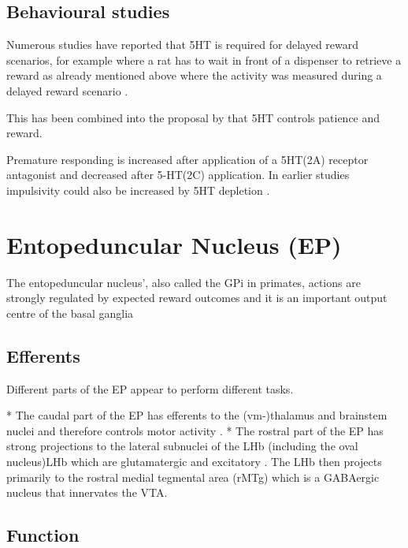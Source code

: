\documentclass[12pt,a4paper]{article}
\let\oldsection\section
\renewcommand\section{\clearpage\oldsection}
\begin{document}
\subsection{Behavioural studies}

Numerous studies have reported that 5HT is required for delayed reward scenarios, for example where a rat has to wait in front of a dispenser to retrieve a reward \citep{Khani2016} as already mentioned above where the activity was measured during a delayed reward scenario \citep{Li2016}.

This has been combined into the proposal by \citep{Miyazaki2012} that 5HT controls patience and reward.

Premature responding is increased after \citep{Fletcher2007} application of a 5HT(2A) receptor antagonist and decreased after 5-HT(2C) application. In earlier studies impulsivity could also be increased by 5HT depletion \citep{Harrison1997}.







\section{Entopeduncular Nucleus (EP)}

The entopeduncular nucleus’, also called the GPi in primates, actions are
strongly regulated by expected reward outcomes and it is an important output centre of the basal ganglia \citep{Rajakumar1993} 

\subsection{Efferents}

Different parts of the EP appear to perform different tasks. 

  * The caudal part of the EP has efferents to the (vm-)thalamus and brainstem nuclei and therefore controls motor activity \citep{Rajakumar1993}  \citep{Wallace2017}.
  * The rostral part of the EP has strong projections to the lateral subnuclei of the LHb (including the oval nucleus)LHb \citep{Rajakumar1993}\citep{Hong2008} which are glutamatergic and excitatory \citep{Shabel2012} \citep{Wallace2017}. The LHb then projects primarily to the rostral medial tegmental area (rMTg) which is a GABAergic nucleus that innervates the VTA.

\subsection{Function}
\end{document}
